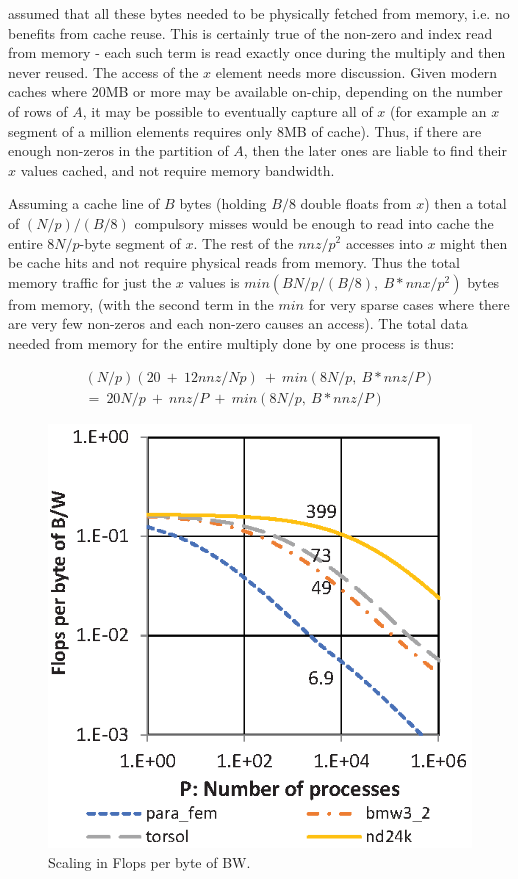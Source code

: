 \cite{techbib:marjanovic2014performance} assumed that all these bytes needed to be physically fetched from memory, i.e. no benefits from cache reuse. This is certainly true of the non-zero and index read from memory - each such term is read exactly once during the multiply and then never reused. The access of the $x$ element needs more discussion. Given modern caches where 20MB or more may be available on-chip, depending on the number of rows of $A$, it may be possible to eventually capture all of $x$ (for example an $x$ segment of a million elements requires only 8MB of cache). Thus, if there are enough non-zeros in the partition of $A$, then the later ones are liable to find their $x$ values cached, and not require memory bandwidth.

Assuming a cache line of $B$ bytes (holding $B/8$ double floats from $x$) then a total of $(N/p)/(B/8)$ compulsory misses would be enough to read into cache the entire $8N/p$-byte segment of $x$. The rest of the $nnz/p^2$ accesses into $x$ might then be cache hits and not require physical reads from memory. Thus the total memory traffic for just the $x$ values is $min(BN/p/(B/8),~B*nnx/p^2)$ bytes from memory, (with the second term in the $min$ for very sparse cases where there are very few non-zeros and each non-zero causes an access). The total data needed from memory for the entire multiply done by one process is thus:

\begin{eqnarray}\label{eq:1process}
(N/p)(20~+~12nnz/Np)~+~min(8N/p,~B*nnz/P)  \\
=~20N/p~+~nnz/P~+~min(8N/p,~B*nnz/P) 
\end{eqnarray}

\begin{figure}\begin{centering}
\includegraphics[scale=0.75]{figures/spmv-flop-per-byte-vs-P.eps}
\caption{Scaling in Flops per byte of BW.}
\label{fig:spmv-flop-per-byte-vs-P}
\end{centering}\end{figure}

